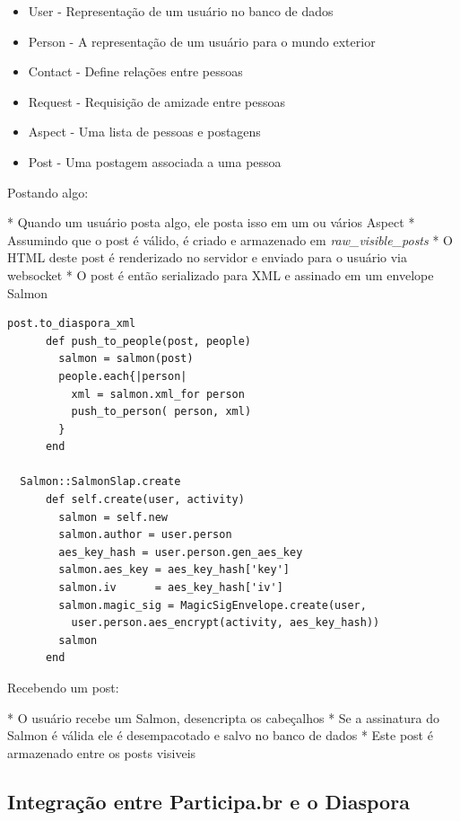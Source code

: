 \documentclass[12pt]{article}
\begin{document}
\begin{itemize}
  \item User - Representação de um usuário no banco de dados
  \item Person - A representação de um usuário para o mundo exterior
  \item Contact - Define relações entre pessoas
  \item Request - Requisição de amizade entre pessoas
  \item Aspect - Uma lista de pessoas e postagens
  \item Post - Uma postagem associada a uma pessoa
\end{itemize}

Postando algo:

* Quando um usuário posta algo, ele posta isso em um ou vários Aspect
* Assumindo que o post é válido, é criado e armazenado em {\it raw\_visible\_posts}
* O HTML deste post é renderizado no servidor e enviado para o usuário via websocket
* O post é então serializado para XML e assinado em um envelope Salmon

\begin{framed}
\begin{lstlisting}[caption=Exemplo envio de mensagem e como o Diaspora serializa para XML]
  post.to_diaspora_xml
      def push_to_people(post, people)
        salmon = salmon(post)
        people.each{|person|
          xml = salmon.xml_for person
          push_to_person( person, xml)
        }
      end
  
  Salmon::SalmonSlap.create
      def self.create(user, activity)
        salmon = self.new
        salmon.author = user.person
        aes_key_hash = user.person.gen_aes_key
        salmon.aes_key = aes_key_hash['key']
        salmon.iv      = aes_key_hash['iv']
        salmon.magic_sig = MagicSigEnvelope.create(user,
          user.person.aes_encrypt(activity, aes_key_hash))
        salmon
      end
\end{lstlisting}
\end{framed}

Recebendo um post:

* O usuário recebe um Salmon, desencripta os cabeçalhos
* Se a assinatura do Salmon é válida ele é desempacotado e salvo no banco de dados
* Este post é armazenado entre os posts visiveis

\subsection{Integração entre Participa.br e o Diaspora}
\end{document}
